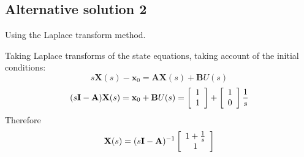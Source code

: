  
\subsection*{Alternative solution 2} 
Using the Laplace transform method.

Taking Laplace transforms of the state equations, taking account of the initial conditions:
\[
s\mathbf{X}(s)-\mathbf{x}_0=\mathbf{A}\mathbf{X}(s)+\mathbf{B}U(s)
\]
\[
(s{\bf{I}} - {\bf{A}}){\bf{X}}(s) = {\bf{x}}_0  + {\bf{B}}U(s) = \left[ {\begin{array}{*{20}c}
   1  \\
   1  \\
\end{array}} \right] + \left[ {\begin{array}{*{20}c}
   1  \\
   0  \\
\end{array}} \right]\frac{1}{s}
\]
Therefore
\[
{\bf{X}}(s) = (s{\bf{I}} - {\bf{A}})^{ - 1} \left[ {\begin{array}{*{20}c}
   {1 + \frac{1}{s}}  \\
   1  \\
\end{array}} \right]
\]

